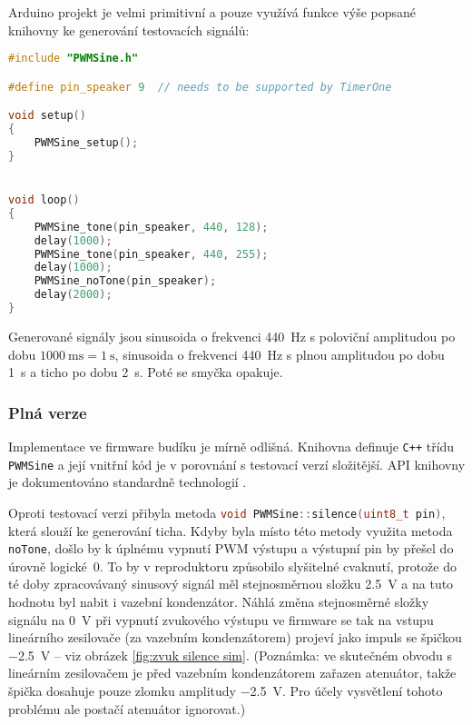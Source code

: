 Arduino projekt  je velmi primitivní a pouze využívá funkce
výše popsané knihovny ke generování testovacích signálů:
\begin{lstlisting}[language=C++,style=numbers]
#include "PWMSine.h"

#define pin_speaker 9  // needs to be supported by TimerOne

void setup()
{
    PWMSine_setup();
}


void loop()
{
    PWMSine_tone(pin_speaker, 440, 128);
    delay(1000);
    PWMSine_tone(pin_speaker, 440, 255);
    delay(1000);
    PWMSine_noTone(pin_speaker);
    delay(2000);
}
\end{lstlisting}
Generované signály jsou sinusoida o frekvenci \SI{440}{\hertz} s poloviční
amplitudou po dobu $\SI{1000}{\milli\second} = \SI{1}{\second}$, sinusoida
o frekvenci \SI{440}{\hertz} s plnou amplitudou po dobu \SI{1}{\second} a ticho
po dobu \SI{2}{\second}. Poté se smyčka opakuje.


\subsubsection{Plná verze}
Implementace ve firmware budíku je mírně odlišná. Knihovna 
definuje \texttt{C++} třídu \texttt{PWMSine} a její vnitřní kód je v porovnání
s testovací verzí složitější. API knihovny je dokumentováno standardně
technologií .

Oproti testovací verzi přibyla metoda
\lstinline[language=C++]!void PWMSine::silence(uint8_t pin)!, která slouží ke
generování ticha. Kdyby byla místo této metody využita metoda \texttt{noTone},
došlo by k úplnému vypnutí PWM výstupu a výstupní pin by přešel do úrovně
logické~0. To by v reproduktoru způsobilo slyšitelné cvaknutí, protože do té
doby zpracovávaný sinusový signál měl stejnosměrnou složku \SI{2,5}{\volt} a na
tuto hodnotu byl nabit i vazební kondenzátor. Náhlá změna stejnosměrné složky
signálu na \SI{0}{\volt} při vypnutí zvukového výstupu ve firmware se tak na
vstupu lineárního zesilovače (za vazebním kondenzátorem) projeví jako impuls se
špičkou \SI{-2,5}{\volt} -- viz obrázek \vref{fig:zvuk silence sim}. (Poznámka:
ve skutečném obvodu s lineárním zesilovačem je před vazebním kondenzátorem
zařazen atenuátor, takže špička dosahuje pouze zlomku amplitudy
\SI{-2,5}{\volt}. Pro účely vysvětlení tohoto problému ale postačí atenuátor
ignorovat.)

